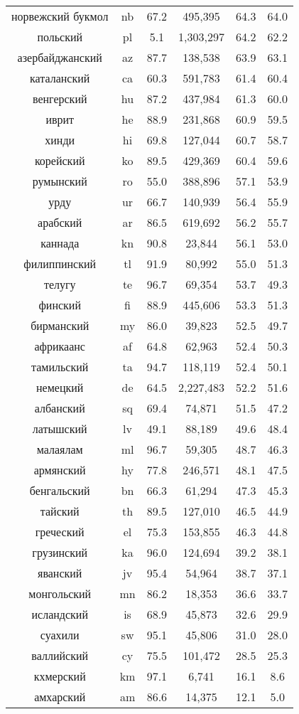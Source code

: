 \begin{table*}
{\begin{tabular}{|c|c|c||c|c|c|}
норвежский букмол & nb & 67.2 & 495,395 & 64.3 & 64.0\\
польский & pl & 5.1 & 1,303,297 & 64.2 & 62.2\\
азербайджанский & az & 87.7 & 138,538 & 63.9 & 63.1\\
каталанский & ca & 60.3 & 591,783 & 61.4 & 60.4\\
венгерский & hu & 87.2 & 437,984 & 61.3 & 60.0\\
иврит & he & 88.9 & 231,868 & 60.9 & 59.5\\
хинди & hi & 69.8 & 127,044 & 60.7 & 58.7\\
корейский & ko & 89.5 & 429,369 & 60.4 & 59.6\\
румынский & ro & 55.0 & 388,896 & 57.1 & 53.9\\
урду & ur & 66.7 & 140,939 & 56.4 & 55.9\\
арабский & ar & 86.5 & 619,692 & 56.2 & 55.7\\
каннада & kn & 90.8 & 23,844 & 56.1 & 53.0\\
филиппинский & tl & 91.9 & 80,992 & 55.0 & 51.3\\
телугу & te & 96.7 & 69,354 & 53.7 & 49.3\\
финский & fi & 88.9 & 445,606 & 53.3 & 51.3\\
бирманский & my & 86.0 & 39,823 & 52.5 & 49.7\\
африкаанс & af & 64.8 & 62,963 & 52.4 & 50.3\\
тамильский & ta & 94.7 & 118,119 & 52.4 & 50.1\\
немецкий & de & 64.5 & 2,227,483 & 52.2 & 51.6\\
албанский & sq & 69.4 & 74,871 & 51.5 & 47.2\\
латышский & lv & 49.1 & 88,189 & 49.6 & 48.4\\
малаялам & ml & 96.7 & 59,305 & 48.7 & 46.3\\
армянский & hy & 77.8 & 246,571 & 48.1 & 47.5\\
бенгальский & bn & 66.3 & 61,294 & 47.3 & 45.3\\
тайский & th & 89.5 & 127,010 & 46.5 & 44.9\\
греческий & el & 75.3 & 153,855 & 46.3 & 44.8\\
грузинский & ka & 96.0 & 124,694 & 39.2 & 38.1\\
яванский & jv & 95.4 & 54,964 & 38.7 & 37.1\\
монгольский & mn & 86.2 & 18,353 & 36.6 & 33.7\\
исландский & is & 68.9 & 45,873 & 32.6 & 29.9\\
суахили & sw & 95.1 & 45,806 & 31.0 & 28.0\\
валлийский & cy & 75.5 & 101,472 & 28.5 & 25.3\\
кхмерский & km & 97.1 & 6,741 & 16.1 & 8.6\\
амхарский & am & 86.6 & 14,375 & 12.1 & 5.0\\
\end{tabular}
}
\end{table*}
